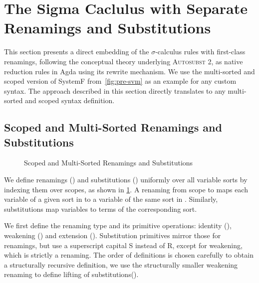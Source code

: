\documentclass[screen,nonacm]{acmart}
\begin{document}
\section{The Sigma Caclulus with Separate Renamings and Substitutions}\label{sec:mis}
This section presents a direct embedding of the $σ$-calculus rules with
first-class renamings, following the conceptual theory underlying
\textsc{Autosubst 2}, as native reduction rules in Agda using its rewrite
mechanism. We use the multi-sorted and scoped version of SystemF
from~\cref{fig:pre-svm} as an example for any custom syntax. The approach
described in this section directly translates to any multi-sorted and scoped
syntax definition.

\subsection{Scoped and Multi-Sorted Renamings and Substitutions}\label{sec:mis-sub}
\begin{figure}[t]
      \centering
      \small
      \begin{minipage}[t]{0.48\linewidth}
            \small
            \raggedright{}
            \ERen{}
      \end{minipage}
      \hfill
      \begin{minipage}[t]{0.48\linewidth}
            \small
            \raggedright{}
            \ESub{}
      \end{minipage}
      \caption{Scoped and Multi-Sorted Renamings and Substitutions}\label{fig:mis-ras}
\end{figure}

We define renamings () and substitutions
() uniformly over all variable sorts by indexing them over
scopes, as shown in \cref{fig:mis-ras}. A renaming from scope  to
 maps each variable of a given sort in  to a
variable of the same sort in . Similarly, substitutions map
variables to terms of the corresponding sort.

We first define the renaming type and its primitive operations: identity
(), weakening () and extension
(). Substitution primitives mirror those for renamings,
but use a superscript capital S instead of R, except for weakening, which is
strictly a renaming. The order of definitions is chosen carefully to obtain a
structurally recursive definition, we use the structurally smaller weakening
renaming to define lifting of substitutions().
\end{document}
